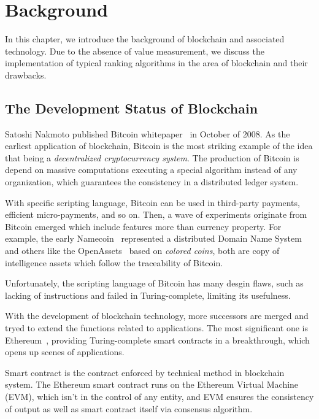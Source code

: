 
\section{Background}
In this chapter, we introduce the background of blockchain and associated technology. Due to the absence of value measurement, we discuss the implementation of typical ranking algorithms in the area of blockchain and their drawbacks.

\subsection{The Development Status of Blockchain}

Satoshi Nakmoto published Bitcoin whitepaper~\cite{Nakamoto2008} in October of 2008. As the earliest application of blockchain, Bitcoin is the most striking example of the idea that being a \emph{decentralized cryptocurrency system}. The production of Bitcoin is depend on massive computations executing a special algorithm instead of any organization, which guarantees the consistency in a distributed ledger system.

With specific scripting language, Bitcoin can be used in third-party payments, efficient micro-payments, and so on. Then, a wave of experiments originate from Bitcoin emerged which include features more than currency property. For example, the early Namecoin~\cite{Namecoin} represented a distributed Domain Name System and others like the OpenAssets~\cite{OpenAssets} based on \emph{colored coins}, both are copy of intelligence assets which follow the traceability of Bitcoin.

Unfortunately, the scripting language of Bitcoin has many desgin flaws, such as lacking of instructions and failed in Turing-complete, limiting its usefulness.

With the development of blockchain technology, more successors are merged and tryed to extend the functions related to applications. The most significant one is Ethereum~\cite{buterin2013ethereum}, providing Turing-complete smart contracts in a breakthrough, which opens up scenes of applications.

Smart contract is the contract enforced by technical method in blockchain system. The Ethereum smart contract runs on the Ethereum Virtual Machine (EVM), which isn't in the control of any entity, and EVM ensures the consistency of output as well as smart contract itself via consensus algorithm.

